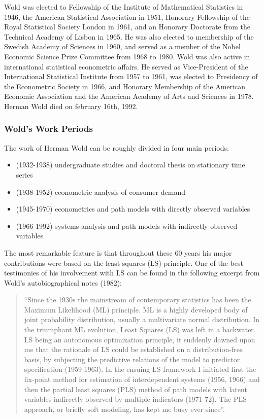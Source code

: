 \documentclass[12pt]{book}\usepackage{graphicx, color}
\begin{document}
Wold was elected to Fellowship of the Institute of Mathematical Statistics in 1946, the American Statistical Association in 1951, Honorary Fellowship of the Royal Statistical Society London in 1961, and an Honorary Doctorate from the Technical Academy of Lisbon in 1965. He was also elected to membership of the Swedish Academy of Sciences in 1960, and served as a member of the Nobel Economic Science Prize Committee from 1968 to 1980. Wold was also active in international statistical econometric affairs. He served as Vice-President of the International Statistical Institute from 1957 to 1961, was elected to Presidency of the Econometric Society in 1966, and Honorary Membership of the American Economic Association and the American Academy of Arts and Sciences in 1978. Herman Wold died on february 16th, 1992.


\subsubsection*{Wold's Work Periods}
The work of Herman Wold can be roughly divided in four main periods:
\begin{itemize}
 \item (1932-1938) undergraduate studies and doctoral thesis on stationary time series 
 \item (1938-1952) econometric analysis of consumer demand 
 \item (1945-1970) econometrics and path models with directly observed variables 
 \item (1966-1992) systems analysis and path models with indirectly observed variables 
\end{itemize}

The most remarkable feature is that throughout these 60 years his major contributions were based on the least squares (LS) principle. One of the best testimonies of his involvement with LS can be found in the following excerpt from Wold's autobiographical notes (1982):
\begin{quotation}\noindent
``Since the 1930s the mainstream of contemporary statistics has been the Maximum Likelihood (ML) principle. ML is a highly developed body of joint probability distribution, usually a multivariate normal distribution. In the triumphant ML evolution, Least Squares (LS) was left in a backwater. LS being an autonomous optimization principle, it suddenly dawned upon me that the rationale of LS could be established on a distribution-free basis, by subjecting the predictive relations of the model to predictor specification (1959-1963). In the ensuing LS framework I initiated first the fix-point method for estimation of interdependent systems (1956, 1966) and then the partial least squares (PLS) method of path models with latent variables indirectly observed by multiple indicators (1971-72). The PLS approach, or briefly soft modeling, has kept me busy ever since''.
\end{quotation}
\end{document}
